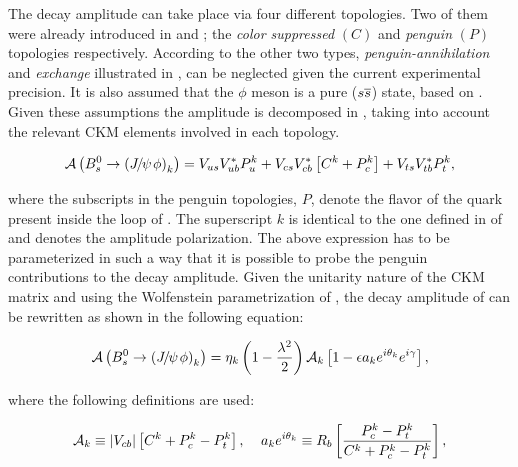 The \BsJpsiPhi decay amplitude can take place via four different topologies.
Two of them were already introduced in  and ;
the {\it color suppressed }$(C)$ and {\it penguin} $(P)$ topologies respectively.
According to \cite{DeBruyn-thesis,DeBruyn:2014oga} the other two types, {\it penguin-annihilation}
and {\it exchange} illustrated in , can be neglected given the current experimental precision.
It is also assumed that the $\phi$ meson is a pure ($s\overline {s}$) state, based on \cite{Faller:2008gt}.
Given these assumptions the \BsJpsiPhi amplitude is decomposed in ,
taking into account the relevant CKM elements involved in each topology.

\begin{equation}
\mathcal{A} \left( B^0_s\rightarrow \left({J\mskip -3mu/\mskip -2mu\psi\mskip 2mu} \phi\right)_{k} \right) = V_{us}V_{ub}^*P_{u}^k + V_{cs}V_{cb}^*\left[ C^k +P_{c}^k \right] + V_{ts}V_{tb}^*P_{t}^k,
 \label{bsjpsiphi_amp}
\end{equation}

\noindent where the subscripts in the penguin topologies, $P$, denote the flavor of the quark present inside
the loop of . The superscript $k$ is identical to the one defined in 
of  and denotes the \BsJpsiPhi amplitude polarization.
The above expression has to be parameterized in such a way that it is possible to probe the penguin contributions to
the \BsJpsiPhi decay amplitude. Given the unitarity nature of the CKM matrix and using the Wolfenstein parametrization
of , the decay amplitude of  can be rewritten as shown in the following equation:

\begin{equation}
  \mathcal{A} \left( B^0_s\rightarrow \left({J\mskip -3mu/\mskip -2mu\psi\mskip 2mu} \phi\right)_{k} \right) = \eta_k  \left( 1-\frac{\lambda^2}{2} \right) \mathcal{A}_{k} \left[  1 - \epsilon a_k e^{i\theta_k} e^{i\gamma}  \right],
 \label{bsjpsiphi_amp_param}
\end{equation}

\noindent where the following definitions are used:

\begin{equation}
  \mathcal{A}_{k} \equiv |V_{cb}| \left[ C^k + P_c^k - P_t^k \right], \;\;\;\; a_k e^{i\theta_k} \equiv R_b \left[  \frac{P_c^k - P_t^k}{C^k + P_c^k - P_t^k}  \right],
  \label{bsjpsiphi_amp_param_defs}
\end{equation}


